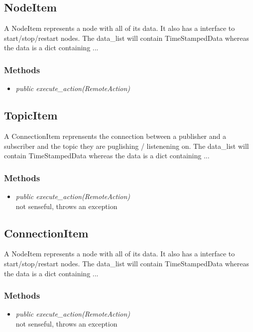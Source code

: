 \subsection{NodeItem}
 A NodeItem represents a node with all of its data. It also has a interface to start/stop/restart nodes.
 The data\_list will contain TimeStampedData whereas the data is a dict containing ...
\subsubsection{Methods}
\begin{itemize}
  \item \textit{public execute\_action(RemoteAction)}\\
  
\end{itemize}

\subsection{TopicItem}
A ConnectionItem reprensents the connection between a publisher and a subscriber and the topic they are puglishing / listenening on.
The data\_list will contain TimeStampedData whereas the data is a dict containing ...
\subsubsection{Methods}
\begin{itemize}
  \item \textit{public execute\_action(RemoteAction)}\\ 
  not senseful, throws an exception
\end{itemize}

\subsection{ConnectionItem}
 A NodeItem represents a node with all of its data. It also has a interface to start/stop/restart nodes.
 The data\_list will contain TimeStampedData whereas the data is a dict containing ...
\subsubsection{Methods}
\begin{itemize}
  \item \textit{public execute\_action(RemoteAction)}\\ 
  not senseful, throws an exception
\end{itemize}

